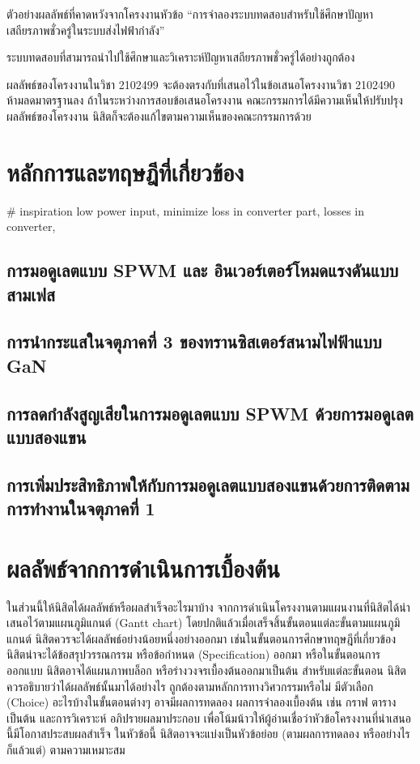 \documentclass[11pt,a4paper]{article}
\begin{document}
ตัวอย่างผลลัพธ์ที่คาดหวังจากโครงงานหัวข้อ “การจำลองระบบทดสอบสำหรับใช้ศึกษาปัญหาเสถียรภาพชั่วครู่ในระบบส่งไฟฟ้ากำลัง”


ระบบทดสอบที่สามารถนำไปใช้ศึกษาและวิเคราะห์ปัญหาเสถียรภาพชั่วครู่ได้อย่างถูกต้อง


ผลลัพธ์ของโครงงานในวิชา 2102499 จะต้องตรงกับที่เสนอไว้ในข้อเสนอโครงงานวิชา 2102490 ห้ามลดมาตรฐานลง ถ้าในระหว่างการสอบข้อเสนอโครงงาน คณะกรรมการได้มีความเห็นให้ปรับปรุงผลลัพธ์ของโครงงาน นิสิตก็จะต้องแก้ไขตามความเห็นของคณะกรรมการด้วย

\section{หลักการและทฤษฎีที่เกี่ยวข้อง}
# inspiration low power input, minimize loss in converter part, losses in converter,  
    \subsection{การมอดูเลตแบบ SPWM และ อินเวอร์เตอร์โหมดแรงดันแบบสามเฟส}
    \subsection{การนำกระแสในจตุภาคที่ 3 ของทรานซิสเตอร์สนามไฟฟ้าแบบ GaN}
    \subsection{การลดกำลังสูญเสียในการมอดูเลตแบบ SPWM ด้วยการมอดูเลตแบบสองแขน}
    \subsection{การเพิ่มประสิทธิภาพให้กับการมอดูเลตแบบสองแขนด้วยการติดตามการทำงานในจตุภาคที่ 1} 
\section{ผลลัพธ์จากการดำเนินการเบื้องต้น}
ในส่วนนี้ให้นิสิตได้ผลลัพธ์หรือผลสำเร็จอะไรมาบ้าง จากการดำเนินโครงงานตามแผนงานที่นิสิตได้นำเสนอไว้ตามแผนภูมิแกนต์ (Gantt chart) โดยปกติแล้วเมื่อเสร็จสิ้นขั้นตอนแต่ละขั้นตามแผนภูมิแกนต์ นิสิตควรจะได้ผลลัพธ์อย่างน้อยหนึ่งอย่างออกมา เช่นในขั้นตอนการศึกษาทฤษฎีที่เกี่ยวข้อง นิสิตน่าจะได้ข้อสรุปวรรณกรรม หรือข้อกำหนด (Specification) ออกมา หรือในขั้นตอนการออกแบบ นิสิตอาจได้แผนภาพบล็อก หรือร่างวงจรเบื้องต้นออกมาเป็นต้น สำหรับแต่ละขั้นตอน นิสิตควรอธิบายว่าได้ผลลัพธ์นั้นมาได้อย่างไร ถูกต้องตามหลักการทางวิศวกรรมหรือไม่ มีตัวเลือก (Choice) อะไรบ้างในขั้นตอนต่างๆ อาจมีผลการทดลอง ผลการจำลองเบื้องต้น เช่น กราฟ ตาราง เป็นต้น และการวิเคราะห์ อภิปรายผลมาประกอบ เพื่อโน้มน้าวให้ผู้อ่านเชื่อว่าหัวข้อโครงงานที่นำเสนอนี้มีโอกาสประสบผลสำเร็จ ในหัวข้อนี้ นิสิตอาจจะแบ่งเป็นหัวข้อย่อย (ตามผลการทดลอง หรืออย่างไรก็แล้วแต่) ตามความเหมาะสม
\end{document}
